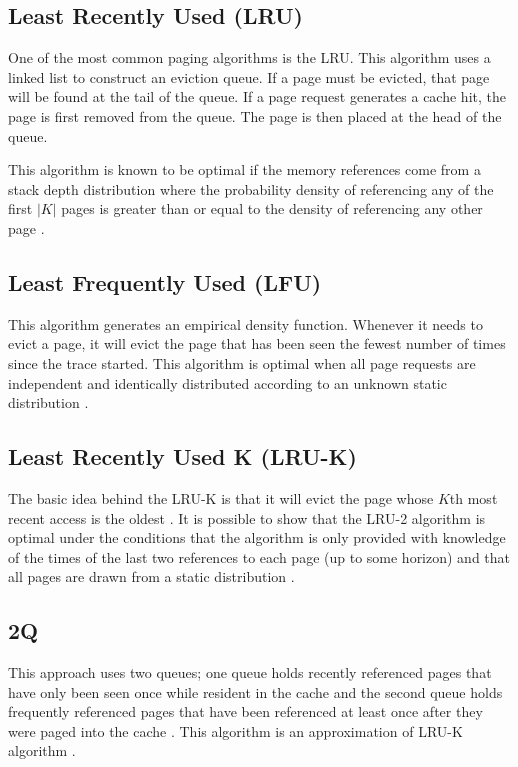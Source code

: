 \subsection{Least Recently Used (LRU)}
  One of the most common paging algorithms is the LRU. This algorithm uses a
  linked list to construct an eviction queue. If a page must be evicted, that
  page will be found at the tail of the queue. If a page request generates a
  cache hit, the page is first removed from the queue. The page is then placed
  at the head of the queue.

  This algorithm is known to be optimal if the memory references come from
  a stack depth distribution where the probability density of referencing any of
  the first $|K|$ pages is greater than or equal to the density of referencing
  any other page \cite{StackDepthDist, wood1983minimization}.

\subsection{Least Frequently Used (LFU)}
  This algorithm generates an empirical density function. Whenever it needs to
  evict a page, it will evict the page that has been seen the fewest number of
  times since the trace started. This algorithm is optimal when all page
  requests are independent and identically distributed according to an unknown
  static distribution \cite{aho1971principles}.

\subsection{Least Recently Used K (LRU-K)}
  The basic idea behind the LRU-K is that it will evict the page whose $K$th
  most recent access is the oldest \cite{o1993lru}. It is possible to show that
  the LRU-2 algorithm is optimal under the conditions that the algorithm is only
  provided with knowledge of the times of the last two references to each page
  (up to some horizon) and that all pages are drawn from a static distribution
  \cite{o1999optimality}.

\subsection{2Q}
  This approach uses two queues; one queue holds recently referenced pages that
  have only been seen once while resident in the cache and the second queue holds
  frequently referenced pages that have been referenced at least once after they
  were paged into the cache \cite{johnson1994x3}. This algorithm is an
  approximation of LRU-K algorithm \cite{arc}.

